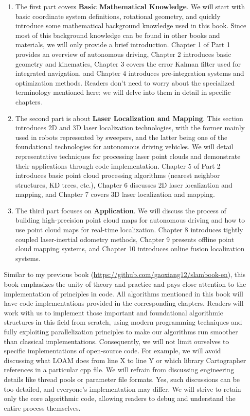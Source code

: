 \begin{enumerate}
	\item The first part covers \textbf{Basic Mathematical Knowledge}. We will start with basic coordinate system definitions, rotational geometry, and quickly introduce some mathematical background knowledge used in this book. Since most of this background knowledge can be found in other books and materials, we will only provide a brief introduction. Chapter 1 of Part 1 provides an overview of autonomous driving, Chapter 2 introduces basic geometry and kinematics, Chapter 3 covers the error Kalman filter used for integrated navigation, and Chapter 4 introduces pre-integration systems and optimization methods. Readers don't need to worry about the specialized terminology mentioned here; we will delve into them in detail in specific chapters.
	\item The second part is about \textbf{Laser Localization and Mapping}. This section introduces 2D and 3D laser localization technologies, with the former mainly used in robots represented by sweepers, and the latter being one of the foundational technologies for autonomous driving vehicles. We will detail representative techniques for processing laser point clouds and demonstrate their applications through code implementation. Chapter 5 of Part 2 introduces basic point cloud processing algorithms (nearest neighbor structures, KD trees, etc.), Chapter 6 discusses 2D laser localization and mapping, and Chapter 7 covers 3D laser localization and mapping.
	\item The third part focuses on \textbf{Application}. We will discuss the process of building high-precision point cloud maps for autonomous driving and how to use point cloud maps for real-time localization. Chapter 8 introduces tightly coupled laser-inertial odometry methods, Chapter 9 presents offline point cloud mapping systems, and Chapter 10 introduces online fusion localization systems.
\end{enumerate}

Similar to my previous book (\url{https://github.com/gaoxiang12/slambook-en}), this book emphasizes the unity of theory and practice and pays close attention to the implementation of principles in code. All algorithms mentioned in this book will have code implementations provided in the corresponding chapters. Readers will work with us to implement those important and foundational algorithmic structures in this field from scratch, using modern programming techniques and fully exploiting parallelization principles to make our algorithms run smoother than classical implementations. Consequently, we will not limit ourselves to specific implementations of open-source code. For example, we will avoid discussing what LOAM does from line X to line Y or which library Cartographer references in a particular cpp file. We will refrain from discussing engineering details like thread pools or parameter file formats. Yes, such discussions can be too detailed, and everyone's implementation may differ. We will strive to retain only the core algorithmic code, allowing readers to debug and understand the entire process themselves.

